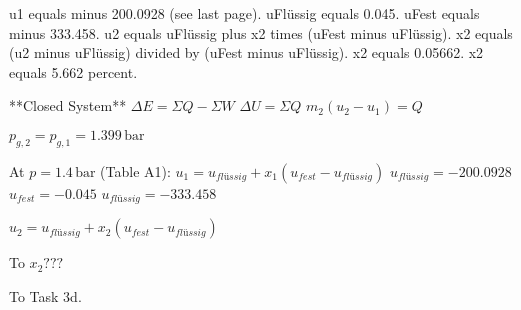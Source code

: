 u1 equals minus 200.0928 (see last page).  
uFlüssig equals 0.045.  
uFest equals minus 333.458.  
u2 equals uFlüssig plus x2 times (uFest minus uFlüssig).  
x2 equals (u2 minus uFlüssig) divided by (uFest minus uFlüssig).  
x2 equals 0.05662.  
x2 equals 5.662 percent.

**Closed System**  
\( \Delta E = \Sigma Q - \Sigma W \)  
\( \Delta U = \Sigma Q \)  
\( m_2 (u_2 - u_1) = Q \)  

\( p_{g,2} = p_{g,1} = 1.399 \, \text{bar} \)  

At \( p = 1.4 \, \text{bar} \) (Table A1):  
\( u_1 = u_{flüssig} + x_1 (u_{fest} - u_{flüssig}) \)  
\( u_{flüssig} = -200.0928 \)  
\( u_{fest} = -0.045 \)  
\( u_{flüssig} = -333.458 \)  

\( u_2 = u_{flüssig} + x_2 (u_{fest} - u_{flüssig}) \)  

To \( x_2 ??? \)  

To Task 3d.